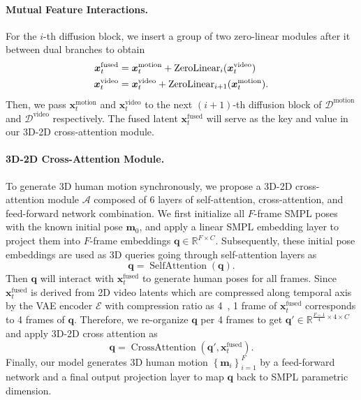 \vspace{-2mm}
\paragraph{Mutual Feature Interactions.} For the $i$-th diffusion block, we insert a group of two zero-linear modules after it between dual branches to obtain
\begin{align}
    \bm{x}_t^\text{fused} &= \bm{x}_t^\text{motion} + \operatorname{ZeroLinear}_{i}(\bm{x}_t^\text{video}) \notag \\
    \bm{x}_t^\text{video} &= \bm{x}_t^\text{video} + \operatorname{ZeroLinear}_{i+1}(\bm{x}_t^\text{motion}).
\label{eq:fuse}
\end{align}
Then, we pass $\bm{x}_t^\text{motion}$ and $\bm{x}_t^\text{video}$ to the next $(i+1)$-th diffusion block of $\mathcal{D}^{\text{motion}}$ and $\mathcal{D}^{\text{video}}$ respectively. The fused latent $\bm{x}_t^\text{fused}$ will serve as the key and value in our 3D-2D cross-attention module.

\vspace{-2mm}
\paragraph{3D-2D Cross-Attention Module.} To generate 3D human motion synchronously, we propose a 3D-2D cross-attention module $\mathcal{A}$ composed of 6 layers of self-attention, cross-attention, and feed-forward network combination. We first initialize all $F$-frame SMPL poses with the known initial pose $\bm{m}_0$, and apply a linear SMPL embedding layer to project them into $F$-frame embeddings $\bm{q}\in\mathbb{R}^{F\times C}$. Subsequently, these initial pose embeddings are used as 3D queries going through self-attention layers as
\begin{equation}
    \bm{q} = \operatorname{SelfAttention}(\bm{q}).
\end{equation}
Then $\bm{q}$ will interact with $\bm{x}_t^{\text{fused}}$ to generate human poses for all frames.
Since $\bm{x}_t^{\text{fused}}$ is derived from 2D video latents which are compressed along temporal axis by the VAE encoder $\mathcal{E}$ with compression ratio as 4~\cite{wan2025wan}, 1 frame of $\bm{x}_t^{\text{fused}}$ corresponds to 4 frames of $\bm{q}$. Therefore, we re-organize $\bm{q}$ per 4 frames to get $\bm{q}'\in\mathbb{R}^{\frac{F-1}{4}\times4\times C}$ and apply 3D-2D cross attention as
\begin{equation}
    \bm{q} = \operatorname{CrossAttention}(\bm{q}',\bm{x}_t^{\text{fused}}).
\end{equation}
Finally, our model generates 3D human motion $\left\{\bm{m}_i\right\}_{i=1}^F$ by a feed-forward network and a final output projection layer to map $\bm{q}$ back to SMPL parametric dimension.

